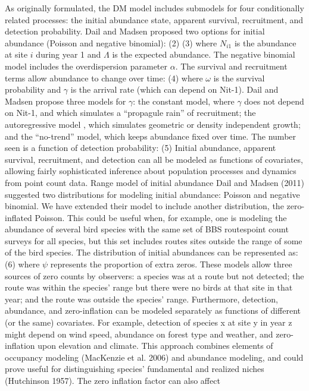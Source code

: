 \documentclass[12pt]{article}
\begin{document}
As originally formulated, the DM model includes submodels for four
conditionally related processes: the initial abundance state, apparent
survival, recruitment, and detection probability. Dail and Madsen
proposed two options for initial abundance (Poisson and negative
binomial):
(2)
(3)
where $N_{i1}$  is the abundance at site $i$  during year 1 and $\Lambda$ is
the expected abundance. The negative binomial model includes the
overdispersion parameter $\alpha$.  The survival and recruitment terms allow
abundance to change over time:
(4)
where $\omega$ is the survival probability and $\gamma$ is the arrival rate (which
can depend on Nit-1). Dail and Madsen propose three models for $\gamma$: the
constant model, where $\gamma$ does not depend on Nit-1, and which simulates
a ``propagule rain'' of recruitment; the autoregressive model , which
simulates geometric or density independent growth; and the ``no-trend''
model, which keeps abundance fixed over time.
The number seen is a function of detection probability:
(5)
Initial abundance, apparent survival, recruitment, and detection can
all be modeled as functions of covariates, allowing fairly
sophisticated inference about population processes and dynamics from
point count data.
Range model of initial abundance
Dail and Madsen (2011) suggested two distributions for modeling
initial abundance: Poisson and negative binomial.  We have extended
their model to include another distribution, the zero-inflated
Poisson.  This could be useful when, for example, one is modeling the
abundance of several bird species with the same set of BBS routespoint
count surveys for all species, but this set includes routes sites
outside the range of some of the bird species.  The distribution of
initial abundances can be represented as:
(6)
where $\psi$ represents the proportion of extra zeros.
These models allow three sources of zero counts by observers: a
species was at a route but not detected; the route was within the
species' range but there were no birds at that site in that year; and
the route was outside the species' range.  Furthermore, detection,
abundance, and zero-inflation can be modeled separately as functions
of different (or the same) covariates.  For example, detection of
species x at site y in year z might depend on wind speed, abundance on
forest type and weather, and zero-inflation upon elevation and
climate.  This approach combines elements of occupancy modeling
(MacKenzie et al. 2006) and abundance modeling, and could prove useful
for distinguishing species' fundamental and realized niches
(Hutchinson 1957).   The zero inflation factor can also affect
\end{document}
